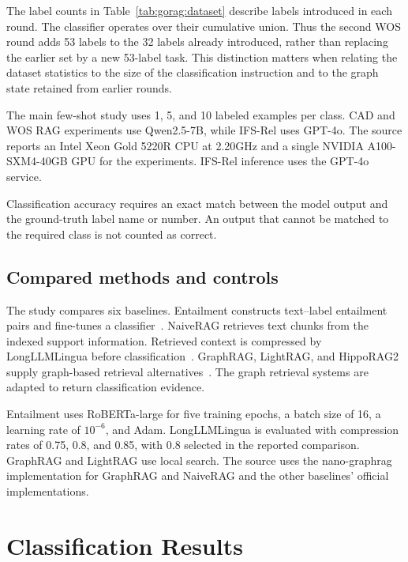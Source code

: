 

The label counts in Table~\ref{tab:gorag:dataset} describe labels introduced in each round. The classifier operates over their cumulative union. Thus the second WOS round adds 53 labels to the 32 labels already introduced, rather than replacing the earlier set by a new 53-label task. This distinction matters when relating the dataset statistics to the size of the classification instruction and to the graph state retained from earlier rounds.

The main few-shot study uses 1, 5, and 10 labeled examples per class. CAD and WOS RAG experiments use Qwen2.5-7B, while IFS-Rel uses GPT-4o. The source reports an Intel Xeon Gold 5220R CPU at 2.20GHz and a single NVIDIA A100-SXM4-40GB GPU for the experiments. IFS-Rel inference uses the GPT-4o service.

Classification accuracy requires an exact match between the model output and the ground-truth label name or number. An output that cannot be matched to the required class is not counted as correct.

\subsection{Compared methods and controls}
\label{sec:gorag:baselines}

The study compares six baselines. Entailment constructs text--label entailment pairs and fine-tunes a classifier~\cite{gorag-xia-etal-2021-incremental}. NaiveRAG retrieves text chunks from the indexed support information. Retrieved context is compressed by LongLLMLingua before classification~\cite{gorag-jiang-etal-2024-longllmlingua}. GraphRAG, LightRAG, and HippoRAG2 supply graph-based retrieval alternatives~\cite{gorag-edge2024local,gorag-guo2024lightrag,gorag-gutierrez2025memory}. The graph retrieval systems are adapted to return classification evidence.

Entailment uses RoBERTa-large for five training epochs, a batch size of 16, a learning rate of $10^{-6}$, and Adam. LongLLMLingua is evaluated with compression rates of 0.75, 0.8, and 0.85, with 0.8 selected in the reported comparison. GraphRAG and LightRAG use local search. The source uses the nano-graphrag implementation for GraphRAG and NaiveRAG and the other baselines' official implementations.

\section{Classification Results}
\label{sec:gorag:results}

